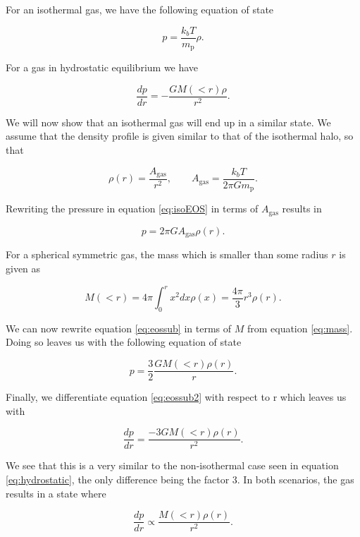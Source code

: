 \documentclass[a4paper]{article}
\begin{document}
For an isothermal gas, we have the following equation of state

\begin{equation}\label{eq:isoEOS}
    p = \frac{k_b T}{m_\text{p}} \rho.
\end{equation}

\noindent For a gas in hydrostatic equilibrium we have

\begin{equation}\label{eq:hydrostatic}
    \frac{dp}{dr} = - \frac{GM(<r)\rho}{r^2}.
\end{equation}

\noindent We will now show that an isothermal gas will end up in a similar state. We
assume
that the density profile is given similar to that of the isothermal halo, so that 

\begin{equation*}
    \rho (r) = \frac{A_\text{gas}}{r^2}, \qquad  A_\text{gas}  = \frac{k_b T}{2\pi G
    m_\text{p}}.
\end{equation*}

\noindent Rewriting the pressure in equation \eqref{eq:isoEOS} in terms of $ A_\text{gas} $
results in

\begin{equation}\label{eq:eossub}
    p = 2\pi G  A_\text{gas}  \rho (r).
\end{equation}

\noindent For a spherical symmetric gas, the mass which is smaller than some radius $r$
is given as

\begin{equation}\label{eq:mass}
    M (<r) = 4\pi \int_0^r x^2 dx \rho(x)  = \frac{4\pi}{3}r^3\rho(r) .
\end{equation}

\noindent We can now rewrite equation \eqref{eq:eossub} in terms of $M $ from equation 
\eqref{eq:mass}. Doing so leaves us with the following equation of state

\begin{equation}\label{eq:eossub2}
    p = \frac{3}{2} \frac{G M (<r) \rho (r)}{r}.
\end{equation}

\noindent Finally, we differentiate equation \eqref{eq:eossub2} with respect to r which 
leaves us with 

\begin{equation}\label{eq:isohydro}
    \frac{dp}{dr} = \frac{-3GM(<r) \rho(r)}{r^2}.
\end{equation}

\noindent We see that this is a very similar to the non-isothermal case seen in equation
\eqref{eq:hydrostatic}, the only difference being the factor 3. In both scenarios, the
gas results in a state where

\begin{equation}\label{eq:hydroprop}
    \frac{dp}{dr} \propto \frac{M(<r)\rho(r)}{r^2}.
\end{equation}
\end{document}
